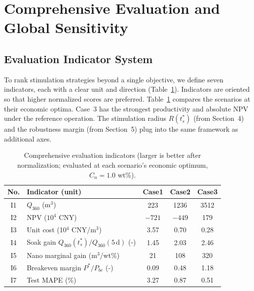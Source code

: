 \section{Comprehensive Evaluation and Global Sensitivity}

\subsection{Evaluation Indicator System}
To rank stimulation strategies beyond a single objective, we define seven
indicators, each with a clear unit and direction (Table~\ref{tbl:indicators}).
Indicators are oriented so that higher normalized scores are preferred.
Table~\ref{tbl:indicators} compares the scenarios at their economic optima.
Case~3 has the strongest productivity and absolute NPV under the reference
operation. The stimulation radius $R(t_s^*)$
(from Section~4) and the robustness margin (from Section~5) plug into the
same framework as additional axes.

\begin{table}[h!t]
\centering
\caption{Comprehensive evaluation indicators (larger is better after
normalization; evaluated at each scenario's economic optimum, $C_n=1.0$ wt\%).}
\label{tbl:indicators}
\small
\begin{tabular}{clccc}
\toprule[1.5pt]
No. & Indicator (unit) & Case1 & Case2 & Case3\\
\midrule[1pt]
I1 & $Q_{360}$ (m$^3$)                  & 223   & 1236  & 3512\\
I2 & NPV ($10^4$ CNY)                  & $-721$ & $-449$ & 179\\
I3 & Unit cost (10$^4$ CNY/m$^3$)      & 3.57  & 0.70  & 0.28\\
I4 & Soak gain $Q_{360}(t_s^*)/Q_{360}(5\,\mathrm{d})$ (-)
                                       & 1.45  & 2.03  & 2.46\\
I5 & Nano marginal gain (m$^3$/wt\%)  & 21    & 108   & 320\\
I6 & Breakeven margin $P^*/P_{be}$ (-) & 0.09  & 0.48  & 1.18\\
I7 & Test MAPE (\%)                    & 3.27  & 0.87  & 0.51\\
\bottomrule[1.5pt]
\end{tabular}
\end{table}

